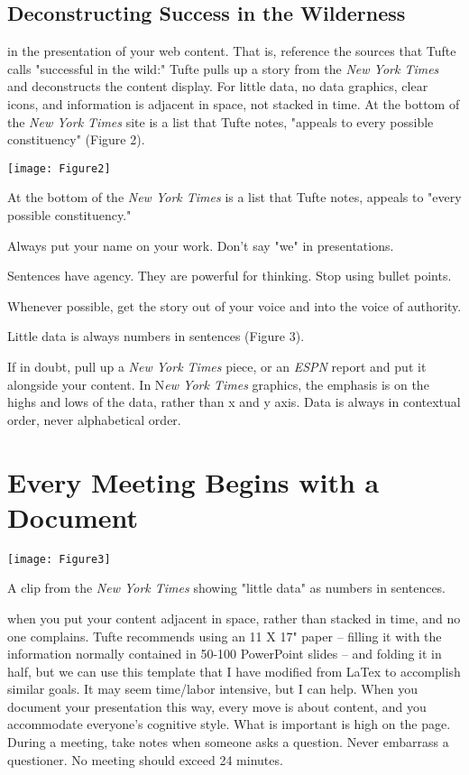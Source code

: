 \documentclass{tufte-handout}
\begin{document}
\subsection{Deconstructing Success in the Wilderness}



 in the presentation of your web content.  That is, reference the sources that Tufte calls "successful in the wild:"  Tufte pulls up a story from the \textit{New York Times} and deconstructs the content display.  For little data, no data graphics, clear icons, and information is adjacent in space, not stacked in time.  At the bottom of the \textit{New York Times} site is a list that Tufte notes, "appeals to every possible constituency" (Figure 2).  



\begin{marginfigure}
\texttt{[image: Figure2]}
\caption{At the bottom of the \textit{New York Times} is a list that Tufte notes, appeals to "every possible constituency."}
\end{marginfigure}



Always put your name on your work. Don't say "we" in presentations.

Sentences have agency. They are powerful for thinking. Stop using bullet points.

Whenever possible, get the story out of your voice and into the voice of authority.

Little data is always numbers in sentences (Figure 3).

If in doubt, pull up a \textit{New York Times} piece, or an \textit{ESPN} report and put it alongside your content. In N\textit{ew York Times} graphics, the emphasis is on the highs and lows of the data, rather than x and y axis.  Data is always in contextual order, never alphabetical order.


\section{Every Meeting Begins with a Document}



\begin{marginfigure}
\texttt{[image: Figure3]}
\caption{A clip from the \textit{New York Times} showing "little data" as numbers in sentences.}
\end{marginfigure}

 when you put your content adjacent in space, rather than stacked in time, and no one complains.  Tufte recommends using an 11 X 17" paper -- filling it with the information normally contained in 50-100 PowerPoint slides -- and folding it in half, but we can use this template that I have modified from LaTex to accomplish similar goals.  It may seem time/labor intensive, but I can help.  When you document your presentation this way, every move is about content, and you accommodate everyone's cognitive style. What is important is high on the page. During a meeting, take notes when someone asks a question. Never embarrass a questioner. No meeting should exceed 24 minutes.
\end{document}
